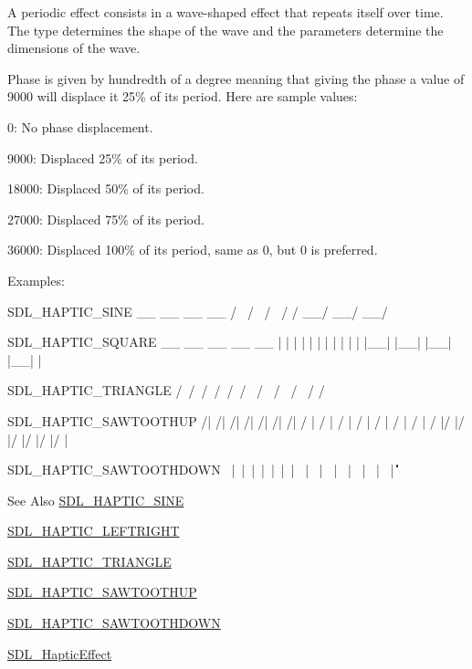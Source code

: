 A periodic effect consists in a wave-\/shaped effect that repeats itself over time. The type determines the shape of the wave and the parameters determine the dimensions of the wave.

Phase is given by hundredth of a degree meaning that giving the phase a value of 9000 will displace it 25\% of its period. Here are sample values\-:
\begin{DoxyItemize}
\item 0\-: No phase displacement.
\item 9000\-: Displaced 25\% of its period.
\item 18000\-: Displaced 50\% of its period.
\item 27000\-: Displaced 75\% of its period.
\item 36000\-: Displaced 100\% of its period, same as 0, but 0 is preferred.
\end{DoxyItemize}

Examples\-: \begin{DoxyVerb}SDL_HAPTIC_SINE
  __      __      __      __
 /  \    /  \    /  \    /
/    \__/    \__/    \__/

SDL_HAPTIC_SQUARE
 __    __    __    __    __
|  |  |  |  |  |  |  |  |  |
|  |__|  |__|  |__|  |__|  |

SDL_HAPTIC_TRIANGLE
  /\    /\    /\    /\    /\
 /  \  /  \  /  \  /  \  /
/    \/    \/    \/    \/

SDL_HAPTIC_SAWTOOTHUP
  /|  /|  /|  /|  /|  /|  /|
 / | / | / | / | / | / | / |
/  |/  |/  |/  |/  |/  |/  |

SDL_HAPTIC_SAWTOOTHDOWN
\  |\  |\  |\  |\  |\  |\  |
 \ | \ | \ | \ | \ | \ | \ |
  \|  \|  \|  \|  \|  \|  \|
\end{DoxyVerb}


\begin{DoxySeeAlso}{See Also}
\hyperlink{_s_d_l__haptic_8h_aa6d75adbfcdda5075078e7a2849da5c0}{S\-D\-L\-\_\-\-H\-A\-P\-T\-I\-C\-\_\-\-S\-I\-N\-E} 

\hyperlink{_s_d_l__haptic_8h_ae047624d8458ff6400887c37a36f86d3}{S\-D\-L\-\_\-\-H\-A\-P\-T\-I\-C\-\_\-\-L\-E\-F\-T\-R\-I\-G\-H\-T} 

\hyperlink{_s_d_l__haptic_8h_ae8123eaa51511507375ba6ef9220fa46}{S\-D\-L\-\_\-\-H\-A\-P\-T\-I\-C\-\_\-\-T\-R\-I\-A\-N\-G\-L\-E} 

\hyperlink{_s_d_l__haptic_8h_ab8e3f40f3c2bcee8905d13b634363c3f}{S\-D\-L\-\_\-\-H\-A\-P\-T\-I\-C\-\_\-\-S\-A\-W\-T\-O\-O\-T\-H\-U\-P} 

\hyperlink{_s_d_l__haptic_8h_afd64aa747034a7ccf4b55f6246525701}{S\-D\-L\-\_\-\-H\-A\-P\-T\-I\-C\-\_\-\-S\-A\-W\-T\-O\-O\-T\-H\-D\-O\-W\-N} 

\hyperlink{union_s_d_l___haptic_effect}{S\-D\-L\-\_\-\-Haptic\-Effect} 
\end{DoxySeeAlso}



